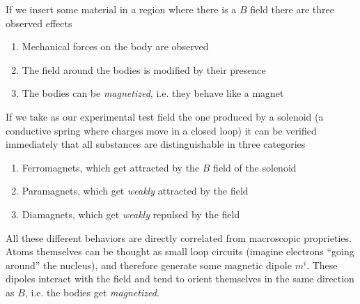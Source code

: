 \documentclass[../electromagnetism.tex]{subfiles}
\begin{document}
If we insert some material in a region where there is a $B$ field there are three observed effects
\begin{enumerate}
\item Mechanical forces on the body are observed
\item The field around the bodies is modified by their presence
\item The bodies can be \textit{magnetized}, i.e. they behave like a magnet
\end{enumerate}
If we take as our experimental test field the one produced by a solenoid (a conductive spring where charges move in a closed loop) it can be verified immediately that all substances are distinguishable in three categories
\begin{enumerate}
\item Ferromagnets, which get attracted by the $B$ field of the solenoid
\item Paramagnets, which get \textit{weakly} attracted by the field
\item Diamagnets, which get \textit{weakly} repulsed by the field
\end{enumerate}
All these different behaviors are directly correlated from macroscopic proprieties.\\
Atoms themselves can be thought as small loop circuits (imagine electrons ``going around'' the nucleus), and therefore generate some magnetic dipole $m^i$. These dipoles interact with the field and tend to orient themselves in the same direction as $B$, i.e. the bodies get \textit{magnetized}.\\
\end{document}
